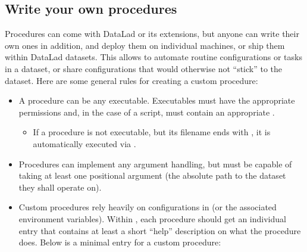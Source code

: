 \subsection{Write your own procedures}
\label{\detokenize{basics/101-124-procedures:write-your-own-procedures}}\label{\detokenize{basics/101-124-procedures:index-6}}
\sphinxAtStartPar
Procedures can come with DataLad or its extensions, but anyone can
write their own ones in addition, and deploy them on individual machines,
or ship them within DataLad datasets. This allows to
automate routine configurations or tasks in a dataset, or share configurations that would otherwise not “stick” to the dataset.
Here are some general rules for creating a custom procedure:
\begin{itemize}
\item {} 
\sphinxAtStartPar
A procedure can be any executable. Executables must have the
appropriate permissions and, in the case of a script,
must contain an appropriate {\hyperref[\detokenize{glossary:term-shebang}]{}}.
\begin{itemize}
\item {} 
\sphinxAtStartPar
If a procedure is not executable, but its filename ends with
, it is automatically executed via {\hyperref[\detokenize{glossary:term-bash}]{}}.

\end{itemize}

\item {} 
\sphinxAtStartPar
Procedures can implement any argument handling, but must be capable
of taking at least one positional argument (the absolute path to the
dataset they shall operate on).

\item {} 
\sphinxAtStartPar
Custom procedures rely heavily on configurations in 
(or the associated environment variables). Within ,
each procedure should get an individual entry that contains at least
a short “help” description on what the procedure does. Below is a minimal
 entry for a custom procedure:

\begin{sphinxVerbatim}[commandchars=\\\{\}]
\end{sphinxVerbatim}


\end{itemize}
